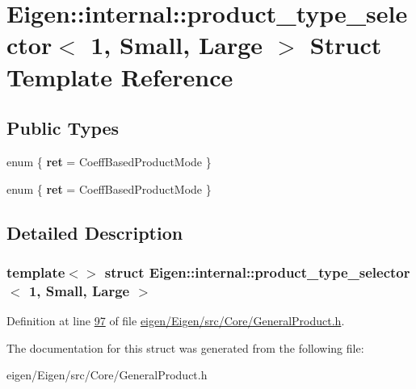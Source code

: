 \hypertarget{struct_eigen_1_1internal_1_1product__type__selector_3_011_00_01_small_00_01_large_01_4}{}\section{Eigen\+:\+:internal\+:\+:product\+\_\+type\+\_\+selector$<$ 1, Small, Large $>$ Struct Template Reference}
\label{struct_eigen_1_1internal_1_1product__type__selector_3_011_00_01_small_00_01_large_01_4}
\subsection*{Public Types}
\begin{DoxyCompactItemize}
\item 
\mbox{\label{struct_eigen_1_1internal_1_1product__type__selector_3_011_00_01_small_00_01_large_01_4_aba440f335c3ff62d5d1ccfc5dd0570d4}} 
enum \{ {\bfseries ret} = Coeff\+Based\+Product\+Mode
 \}
\item 
\mbox{\label{struct_eigen_1_1internal_1_1product__type__selector_3_011_00_01_small_00_01_large_01_4_ae022b81f2d64f46e8ccee27e78cb0dc6}} 
enum \{ {\bfseries ret} = Coeff\+Based\+Product\+Mode
 \}
\end{DoxyCompactItemize}


\subsection{Detailed Description}
\subsubsection*{template$<$$>$\newline
struct Eigen\+::internal\+::product\+\_\+type\+\_\+selector$<$ 1, Small, Large $>$}



Definition at line \hyperlink{eigen_2_eigen_2src_2_core_2_general_product_8h_source_l00097}{97} of file \hyperlink{eigen_2_eigen_2src_2_core_2_general_product_8h_source}{eigen/\+Eigen/src/\+Core/\+General\+Product.\+h}.



The documentation for this struct was generated from the following file\+:\begin{DoxyCompactItemize}
\item 
eigen/\+Eigen/src/\+Core/\+General\+Product.\+h\end{DoxyCompactItemize}
